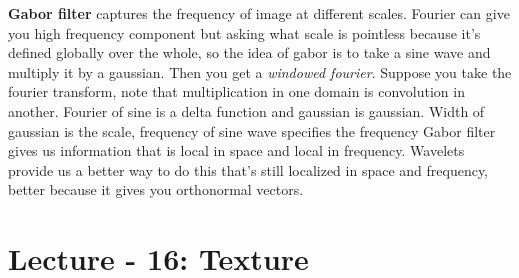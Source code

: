 \textbf{Gabor filter} captures the frequency of image at different
scales. Fourier can give you high frequency component but asking what
scale is pointless because it's defined globally over the whole, so the idea of
gabor is to take a sine wave and multiply it by a gaussian. Then you
get a\emph{ windowed fourier}. Suppose you take the fourier transform,
note that multiplication in one domain is convolution in
another. Fourier of sine is a delta function and gaussian is
gaussian. 
Width of gaussian is the scale, frequency of sine wave specifies the frequency
Gabor filter gives us information that is local in space and local in
frequency. Wavelets provide us a better way to do this that's still
localized in space and frequency, better because it gives you
orthonormal vectors. 



\pagebreak

\section{Lecture - 16: Texture}
\label{sec:lecture-16-1}


